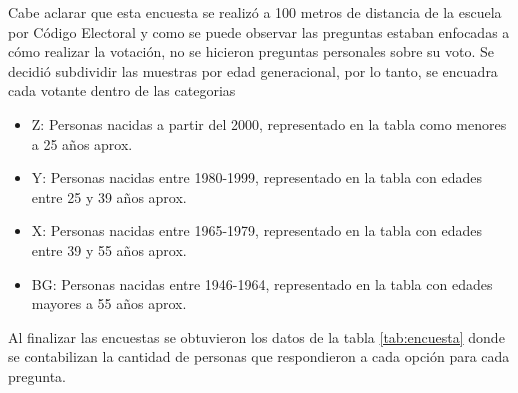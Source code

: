 Cabe aclarar que esta encuesta se realizó a 100 metros de distancia de la escuela por Código Electoral y como se puede observar las preguntas estaban enfocadas a cómo realizar la votación, no se hicieron preguntas personales sobre su voto. Se decidió subdividir las muestras por edad generacional, por lo tanto, se encuadra cada votante dentro de las categorias
\begin{itemize}
    \item Z: Personas nacidas a partir del 2000, representado en la tabla como menores a 25 años aprox.
    \item Y: Personas nacidas entre 1980-1999, representado en la tabla con edades entre 25 y 39 años aprox.
    \item X: Personas nacidas entre 1965-1979, representado en la tabla con edades entre 39 y 55 años aprox.
    \item BG: Personas nacidas entre 1946-1964, representado en la tabla con edades mayores a 55 años aprox.
\end{itemize}
Al finalizar las encuestas se obtuvieron los datos de la tabla \ref{tab:encuesta} donde se contabilizan la cantidad de personas que respondieron a cada opción para cada pregunta.
